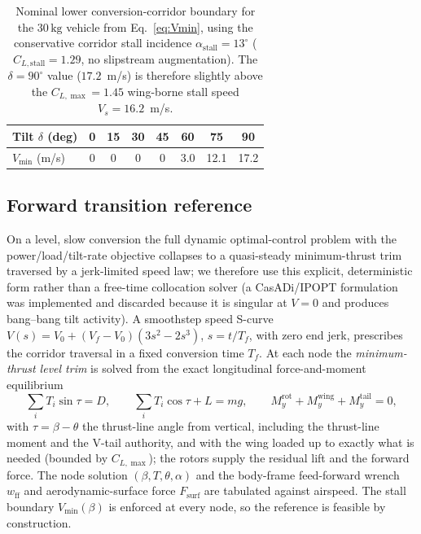 \documentclass[preprint,3p,11pt]{elsarticle}
\newcommand{\SI}[2]{\ensuremath{#1\,#2}}
\newcommand{\kilogram}{\mathrm{kg}}
\begin{document}
\begin{table}[t]
\centering
\caption{Nominal lower conversion-corridor boundary for the \SI{30}{\kilogram}
vehicle from Eq.~\eqref{eq:Vmin}, using the conservative corridor stall
incidence $\alpha_{\mathrm{stall}}=13^\circ$ ($C_{L,\mathrm{stall}}=1.29$, no
slipstream augmentation). The $\delta=90^\circ$ value ($17.2$~m/s) is therefore
slightly above the $C_{L,\max}=1.45$ wing-borne stall speed $V_s=16.2$~m/s.}
\label{tab:corridor}
\small
\begin{tabular}{lccccccc}
\toprule
Tilt $\delta$ (deg) & 0 & 15 & 30 & 45 & 60 & 75 & 90 \\
\midrule
$V_{\min}$ (m/s) & 0 & 0 & 0 & 0 & 3.0 & 12.1 & 17.2 \\
\bottomrule
\end{tabular}
\end{table}

\subsection{Forward transition reference}\label{sec:ocp}
On a level, slow conversion the full dynamic optimal-control problem with the
power/load/tilt-rate objective collapses to a quasi-steady minimum-thrust
trim traversed by a jerk-limited speed law; we therefore use this explicit,
deterministic form rather than a free-time collocation solver (a CasADi/IPOPT
formulation~\cite{andersson2019casadi} was implemented and discarded because it
is singular at
$V=0$ and produces bang--bang tilt activity). A smoothstep speed S-curve
$V(s)=V_0+(V_f-V_0)(3s^2-2s^3)$, $s=t/T_f$, with zero end jerk, prescribes
the corridor traversal in a fixed conversion time $T_f$. At each node the
\emph{minimum-thrust level trim} is solved from the exact longitudinal
force-and-moment equilibrium
\begin{equation}
\sum_i T_i\sin\tau = D,\qquad
\sum_i T_i\cos\tau + L = mg,\qquad
M_y^{\mathrm{rot}}+M_y^{\mathrm{wing}}+M_y^{\mathrm{tail}}=0,
\label{eq:trim}
\end{equation}
with $\tau=\beta-\theta$ the thrust-line angle from vertical, including the
thrust-line moment and the V-tail authority, and with the wing loaded up to
exactly what is needed (bounded by $C_{L,\max}$); the rotors supply the
residual lift and the forward force. The node solution
$(\beta,T,\theta,\alpha)$ and the body-frame feed-forward wrench
$w_{\mathrm{ff}}$ and aerodynamic-surface force $F_{\mathrm{surf}}$ are
tabulated against airspeed. The stall boundary $V_{\min}(\beta)$ is enforced
at every node, so the reference is feasible by construction.
\end{document}
